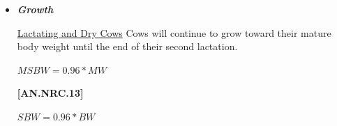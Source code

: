 \documentclass{article}
\begin{document}
\begin{refsection}
\begin{itemize}
        \vspace{0.2cm}
        \underline {Heifers}
        \vspace{0.25cm}
        
\begin{center}
    \(NEa1 = 0.0009 * BW + 0.0016 * BW\) if Housing = Grazing 0
\end{center}
\vspace{0.5cm}

            {\raggedleft \textbf{[AN.NRC.11]}\par}
\textit{\small Otherwise}
\vspace{0.25cm}

\begin{center}
    \(NEa2 = 0.006 * BW\) if Topography = Hilly 0
\end{center}
\vspace{0.5cm}

            {\raggedleft \textbf{[AN.NRC.12]}\par}
            \vspace{0.25cm}
            
\textit{\small Otherwise}
\vspace{0.25cm}

\begin{center}
    \(NEa2 = 0.Distance * 0.00045 * BW + NEa1 + NEa2\) 
\end{center}
\vspace{0.5cm}

            {\raggedleft \textbf{[AN.NRC.10]}\par}

\vspace{0.5cm}


        \item \textbf{\textit{Growth}}
        
        \vspace{0.2cm}
        \underline {Lactating and Dry Cows} Cows will continue to grow toward their mature body weight until the end of their second lactation. 
        \vspace{0.25cm}
        
\begin{center}
    \(MSBW = 0.96 * MW\)
\end{center}
\vspace{0.5cm}
            {\raggedleft \textbf{[AN.NRC.13]}\par}

\vspace{0.25cm}
\begin{center}
    \(SBW = 0.96 * BW\)
\end{center}


\end{itemize}
\end{refsection}
\end{document}
